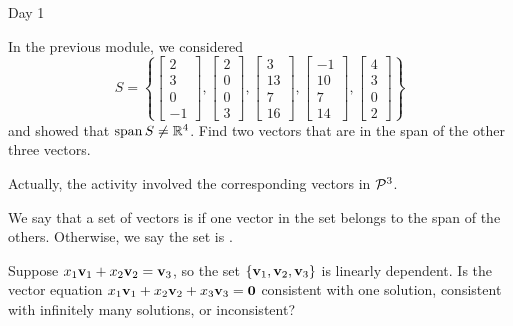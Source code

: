 
\begin{applicationActivities}{Day 1}

\begin{activity}{15}
  In the previous module, we considered
  \[S=\left\{
  \begin{bmatrix}2\\3\\0\\-1\end{bmatrix},
  \begin{bmatrix}2\\0\\0\\3\end{bmatrix},
  \begin{bmatrix}3\\13\\7\\16\end{bmatrix},
  \begin{bmatrix}-1\\10\\7\\14\end{bmatrix},
  \begin{bmatrix}4\\3\\0\\2\end{bmatrix}
  \right\}
  \]
  and showed that \(\vspan S\not=\IR^4\). Find two vectors that
  are in the span of the other three vectors.

  \begin{TBLnote}
    Actually, the activity involved the corresponding vectors in \(\P^3\).
  \end{TBLnote}
\end{activity}

\begin{definition}
  We say that a set of vectors is  if one vector
  in the set belongs to the span of the others. Otherwise, we say the set
  is .
\end{definition}

\begin{activity}{10}
  Suppose \(x_1\vect v_1+x_2\vect v_2=\vect v_3\), so the set
  \(\{\vect v_1,\vect v_2,\vect v_3\}\) is linearly dependent.
  Is the vector equation \(x_1\vect v_1+x_2\vect v_2+x_3\vect v_3=\vect 0\)
  consistent with one solution, consistent with infinitely many solutions,
  or inconsistent?
\end{activity}


\end{applicationActivities}

